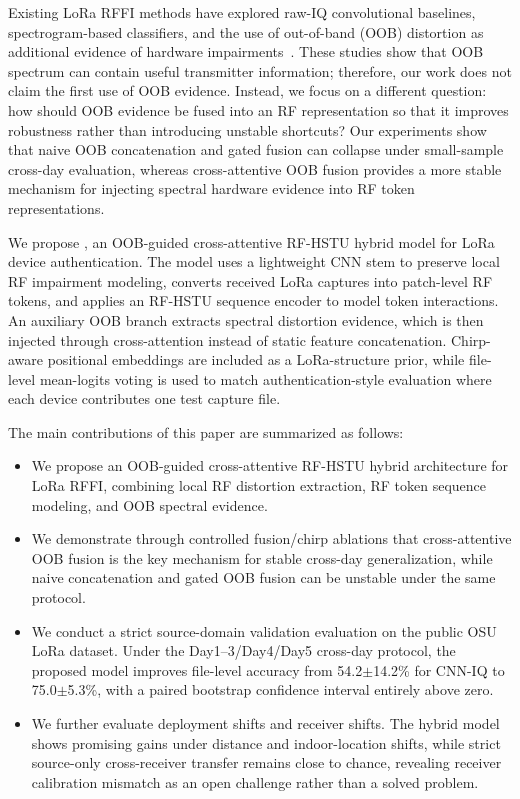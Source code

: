 Existing LoRa RFFI methods have explored raw-IQ convolutional baselines, spectrogram-based classifiers, and the use of out-of-band (OOB) distortion as additional evidence of hardware impairments~\cite{shen2021lora_spectrogram_cnn,elmaghbub2020widescan,hamdaoui2022deeplearning}.
These studies show that OOB spectrum can contain useful transmitter information; therefore, our work does not claim the first use of OOB evidence.
Instead, we focus on a different question: how should OOB evidence be fused into an RF representation so that it improves robustness rather than introducing unstable shortcuts?
Our experiments show that naive OOB concatenation and gated fusion can collapse under small-sample cross-day evaluation, whereas cross-attentive OOB fusion provides a more stable mechanism for injecting spectral hardware evidence into RF token representations.

We propose \model, an OOB-guided cross-attentive RF-HSTU hybrid model for LoRa device authentication.
The model uses a lightweight CNN stem to preserve local RF impairment modeling, converts received LoRa captures into patch-level RF tokens, and applies an RF-HSTU sequence encoder to model token interactions.
An auxiliary OOB branch extracts spectral distortion evidence, which is then injected through cross-attention instead of static feature concatenation.
Chirp-aware positional embeddings are included as a LoRa-structure prior, while file-level mean-logits voting is used to match authentication-style evaluation where each device contributes one test capture file.

The main contributions of this paper are summarized as follows:
\begin{itemize}
  \item We propose an OOB-guided cross-attentive RF-HSTU hybrid architecture for LoRa RFFI, combining local RF distortion extraction, RF token sequence modeling, and OOB spectral evidence.
  \item We demonstrate through controlled fusion/chirp ablations that cross-attentive OOB fusion is the key mechanism for stable cross-day generalization, while naive concatenation and gated OOB fusion can be unstable under the same protocol.
  \item We conduct a strict source-domain validation evaluation on the public OSU LoRa dataset.
        Under the Day1--3/Day4/Day5 cross-day protocol, the proposed model improves file-level accuracy from 54.2$\pm$14.2\% for CNN-IQ to 75.0$\pm$5.3\%, with a paired bootstrap confidence interval entirely above zero.
  \item We further evaluate deployment shifts and receiver shifts.
        The hybrid model shows promising gains under distance and indoor-location shifts, while strict source-only cross-receiver transfer remains close to chance, revealing receiver calibration mismatch as an open challenge rather than a solved problem.
\end{itemize}

